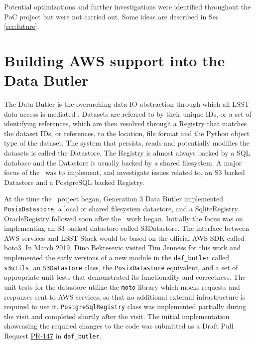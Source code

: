 Potential optimizations and further investigations were identified throughout the PoC project but were not carried out.
Some ideas are described in Sec \ref{sec:future}.


\section{Building AWS support into the Data Butler}
\label{sec:butler}

The Data Butler is the overarching data IO abstraction through which all LSST data access is mediated .
Datasets are referred to by their unique IDs, or a set of identifying references, which are then resolved through a Registry that matches the dataset IDs, or references, to the location, file format and the Python object type of the dataset.
The system that persists, reads and potentially modifies the datasets is called the Datastore.
The Registry is almost always backed by a SQL database and the Datastore is usually backed by a shared filesystem.
A major focus of the \poc~was to implement, and investigate issues related to, an S3 backed Datastore and a PostgreSQL backed Registry.

At the time the \poc~project began, Generation 3 Data Butler implemented \texttt{PosixDatastore}, a local or shared filesystem datastore, and a SqliteRegistry.
OracleRegistry followed soon after the \poc~work began.
Initially the focus was on implementing an S3 backed datastore called S3Datastore.
The interface between AWS services and LSST Stack would be based on the official AWS SDK called boto3.
In March 2019, Dino Bektesevic visited Tim Jenness for this work and implemented the early versions of a new module in the \texttt{daf\_butler} called \texttt{s3utils}, an \texttt{S3Datastore} class, the \texttt{PosixDatastore} equivalent, and a set of appropriate unit tests that demonstrated its functionality and correctness.
The unit tests for the datastore utilize the \texttt{moto} library which mocks requests and responses sent to AWS services, so that no additional external infrastructure is required to use it.
\texttt{PostgreSqlRegistry} class was implemented partially during the visit and completed shortly after the visit.
The initial implementation showcasing the required changes to the code was submitted as a Draft Pull Request \href{https://github.com/lsst/daf_butler/pull/147}{PR-147} in \texttt{daf\_butler}.

